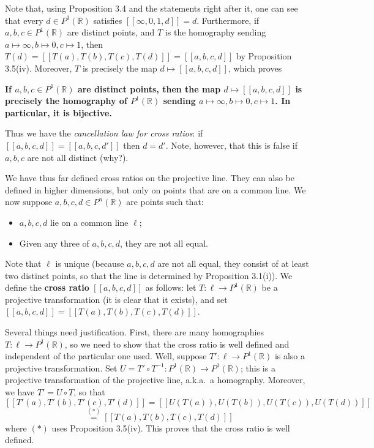 \documentclass[leqno]{book}
\begin{document}
\noindent Note that, using Proposition 3.4 and the statements right after it, one can see that every $d\in P^1(\mathbb R)$ satisfies $[\![\infty,0,1,d]\!]=d$.  Furthermore, if $a,b,c\in P^1(\mathbb R)$ are distinct points, and $T$ is the homography sending $a\mapsto\infty,b\mapsto 0,c\mapsto 1$, then $T(d)=[\![T(a),T(b),T(c),T(d)]\!]=[\![a,b,c,d]\!]$ by Proposition 3.5(iv).  Moreover, $T$ is precisely the map $d\mapsto[\![a,b,c,d]\!]$, which proves
\begin{center}
\textbf{If $a,b,c\in P^1(\mathbb R)$ are distinct points, then the map $d\mapsto[\![a,b,c,d]\!]$ is precisely the homography of $P^1(\mathbb R)$ sending $a\mapsto\infty,b\mapsto 0,c\mapsto 1$.  In particular, it is bijective.}
\end{center}
\noindent Thus we have the \emph{cancellation law for cross ratios}: if $[\![a,b,c,d]\!]=[\![a,b,c,d']\!]$ then $d=d'$.  Note, however, that this is false if $a,b,c$ are not all distinct (why?).

We have thus far defined cross ratios on the projective line.  They can also be defined in higher dimensions, but only on points that are on a common line.  We now suppose $a,b,c,d\in P^n(\mathbb R)$ are points such that:
\begin{itemize}
\item $a,b,c,d$ lie on a common line $\ell$;

\item Given any three of $a,b,c,d$, they are not all equal.
\end{itemize}
Note that $\ell$ is unique (because $a,b,c,d$ are not all equal, they consist of at least two distinct points, so that the line is determined by Proposition 3.1(i)).  We define the \textbf{cross ratio} $[\![a,b,c,d]\!]$ as follows: let $T:\ell\to P^1(\mathbb R)$ be a projective transformation (it is clear that it exists), and set $[\![a,b,c,d]\!]=[\![T(a),T(b),T(c),T(d)]\!]$.

Several things need justification.  First, there are many homographies $T:\ell\to P^1(\mathbb R)$, so we need to show that the cross ratio is well defined and independent of the particular one used.  Well, suppose $T':\ell\to P^1(\mathbb R)$ is also a projective transformation.  Set $U=T'\circ T^{-1}:P^1(\mathbb R)\to P^1(\mathbb R)$; this is a projective transformation of the projective line, a.k.a.~a homography.  Moreover, we have $T'=U\circ T$, so that
$$[\![T'(a),T'(b),T'(c),T'(d)]\!]=[\![U(T(a)),U(T(b)),U(T(c)),U(T(d))]\!]$$
$$\overset{(*)}=[\![T(a),T(b),T(c),T(d)]\!]$$
where $(*)$ uses Proposition 3.5(iv).  This proves that the cross ratio is well defined.
\end{document}
